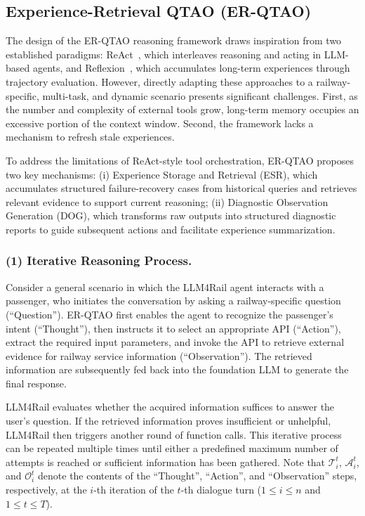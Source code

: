\documentclass[runningheads]{llncs}
\begin{document}
\subsection{Experience-Retrieval QTAO (ER-QTAO)}\label{sec:er_qtao}

The design of the ER-QTAO reasoning framework draws inspiration from two established paradigms: ReAct~\cite{react}, which interleaves reasoning and acting in LLM-based agents, and Reflexion~\cite{reflexion}, which accumulates long-term experiences through trajectory evaluation.
However, directly adapting these approaches to a railway-specific, multi-task, and dynamic scenario presents significant challenges. 
First, as the number and complexity of external tools grow, long-term memory occupies an excessive portion of the context window. 
Second, the framework lacks a mechanism to refresh stale experiences.


To address the limitations of ReAct-style tool orchestration, ER-QTAO proposes two key mechanisms: (i) Experience Storage and Retrieval (ESR), which accumulates structured failure-recovery cases from historical queries and retrieves relevant evidence to support current reasoning; (ii) Diagnostic Observation Generation (DOG), which transforms raw outputs into structured diagnostic reports to guide subsequent actions and facilitate experience summarization.




\subsubsection{(1) Iterative Reasoning Process.}

Consider a general scenario in which the LLM4Rail agent interacts with a passenger, who initiates the conversation by asking a railway-specific question (``Question'').
ER-QTAO first enables the agent to recognize the passenger's intent (``Thought''), then instructs it to select an appropriate API (``Action''), extract the required input parameters, and invoke the API to retrieve external evidence for railway service information (``Observation''). 
The retrieved information are subsequently fed back into the foundation LLM to generate the final response.


LLM4Rail evaluates whether the acquired information suffices to answer the user's question. 
If the retrieved information proves insufficient or unhelpful, LLM4Rail then triggers another round of function calls. 
This iterative process can be repeated multiple times until either a predefined maximum number of attempts is reached or sufficient information has been gathered.
Note that $\mathcal{T}^{t}_{i}$, $\mathcal{A}^{t}_{i}$, and $\mathcal{O}^{t}_{i}$ denote the contents of the ``Thought'', ``Action'', and ``Observation'' steps, respectively, at the $i$-th iteration of the $t$-th dialogue turn ($1\leq i \leq n$ and $1 \leq t \leq T$).
\end{document}

